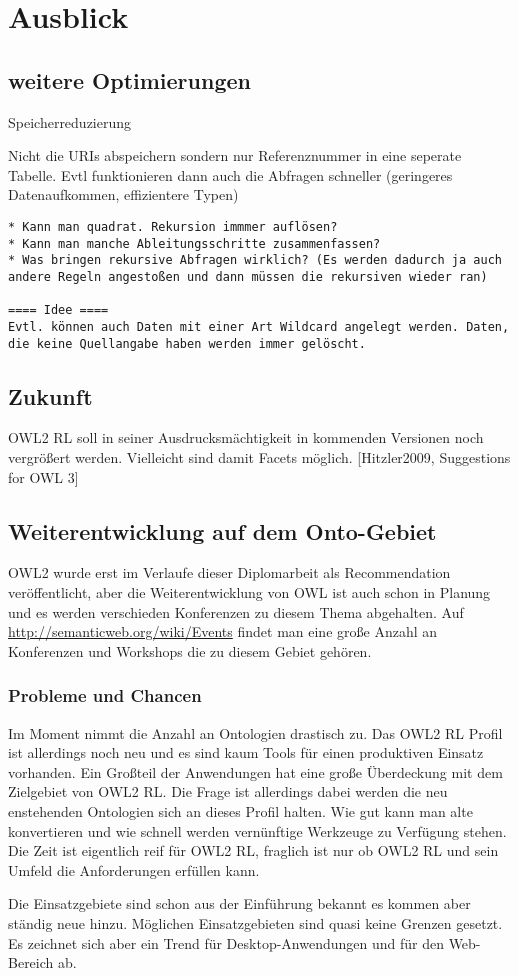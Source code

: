 \chapter{Ausblick}
\label{kapitel-ausblick}

\section{weitere Optimierungen}
Speicherreduzierung

Nicht die URIs abspeichern sondern nur Referenznummer in eine seperate Tabelle. Evtl funktionieren dann auch die Abfragen schneller (geringeres Datenaufkommen, effizientere Typen)

\begin{verbatim} 
* Kann man quadrat. Rekursion immmer auflösen?
* Kann man manche Ableitungsschritte zusammenfassen?
* Was bringen rekursive Abfragen wirklich? (Es werden dadurch ja auch andere Regeln angestoßen und dann müssen die rekursiven wieder ran)

==== Idee ====
Evtl. können auch Daten mit einer Art Wildcard angelegt werden. Daten, die keine Quellangabe haben werden immer gelöscht.

\end{verbatim}

\section{Zukunft}
OWL2 RL soll in seiner Ausdrucksmächtigkeit in kommenden Versionen noch vergrößert werden. Vielleicht sind damit Facets möglich. [Hitzler2009, Suggestions for OWL 3]


\section{Weiterentwicklung auf dem Onto-Gebiet}
OWL2 wurde erst im Verlaufe dieser Diplomarbeit als Recommendation veröffentlicht, aber die Weiterentwicklung von OWL ist auch schon in Planung \cite{Hitzler2009} und es werden verschieden Konferenzen zu diesem Thema abgehalten. Auf \url{http://semanticweb.org/wiki/Events}
findet man eine große Anzahl an Konferenzen und Workshops die zu diesem Gebiet gehören.

\subsection{Probleme und Chancen}
Im Moment nimmt die Anzahl an Ontologien drastisch zu. Das OWL2 RL Profil ist allerdings noch neu und es sind kaum Tools für einen produktiven Einsatz vorhanden. Ein Großteil der Anwendungen hat eine große Überdeckung mit dem Zielgebiet von OWL2 RL. Die Frage ist allerdings dabei werden die neu enstehenden Ontologien sich an dieses Profil halten. Wie gut kann man alte konvertieren und wie schnell werden vernünftige Werkzeuge zu Verfügung stehen. Die Zeit ist eigentlich reif für OWL2 RL, fraglich ist nur ob OWL2 RL und sein Umfeld die Anforderungen erfüllen kann.

Die Einsatzgebiete sind schon aus der Einführung bekannt es kommen aber ständig neue hinzu. Möglichen Einsatzgebieten sind quasi keine Grenzen gesetzt. Es zeichnet sich aber ein Trend für Desktop-Anwendungen und für den Web-Bereich ab.